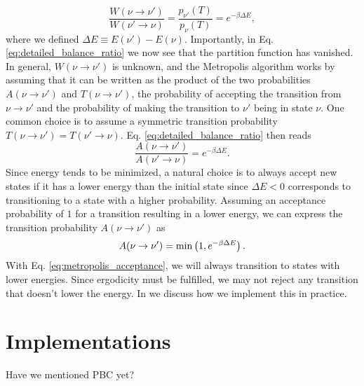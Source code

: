 \begin{equation}\label{eq:detailed_balance_ratio}
    \frac{W(\nu\to \nu')}{W(\nu'\to \nu)} = \frac{p_{\nu'}(T)}{p_\nu(T)} = e^{-\beta \Delta E},
\end{equation}
where we defined $\Delta E \equiv E(\nu')-E(\nu)$. Importantly, in Eq. \eqref{eq:detailed_balance_ratio} we now see that the partition function has vanished. In general, $W(\nu\to\nu')$ is unknown, and the Metropolis algorithm works by assuming that it can be written as the product of the two probabilities $A(\nu\to\nu')$ and $T(\nu\to\nu')$, the probability of accepting the transition from $\nu\to\nu'$ and the probability of making the transition to $\nu'$ being in state $\nu$. One common choice is to assume a symmetric transition probability $T(\nu\to\nu')=T(\nu'\to\nu)$. Eq. \eqref{eq:detailed_balance_ratio} then reads 
\begin{equation}\label{eq:acceptance_rate}
    \frac{A(\nu\to\nu')}{A(\nu'\to\nu)}=e^{-\beta \Delta E}. 
\end{equation}
Since energy tends to be minimized, a natural choice is to always accept new states if it has a lower energy than the initial state since $\Delta E<0$ corresponds to transitioning to a state with a higher probability. Assuming an acceptance probability of $1$ for a transition resulting in a lower energy, we can express the transition probability $A(\nu\to\nu')$ as 
\begin{equation} \label{eq:metropolis_acceptance}
    A(\nu\to\nu') = \min\left( 1,e^{-\beta \Delta E} \right).
\end{equation}  
With Eq. \eqref{eq:metropolis_acceptance}, we will always transition to states with lower energies. Since ergodicity must be fulfilled, we may not reject any transition that doesn't lower the energy. In  we discuss how we implement this in practice.    


\section{Implementations}\label{sec:implementations}
\alert{Have we mentioned PBC yet?}


